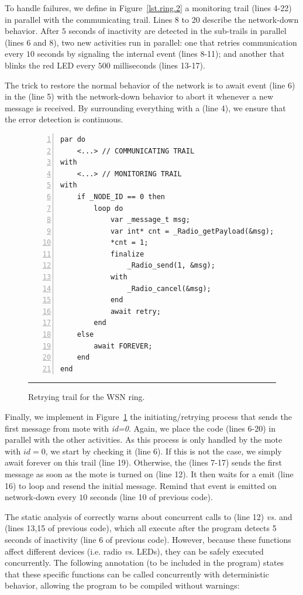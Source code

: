 To handle failures, we define in Figure~\ref{lst.ring.2} a monitoring trail 
(lines 4-22) in parallel with the communicating trail.
%
Lines 8 to 20 describe the network-down behavior.
After $5$ seconds of inactivity are detected in the sub-trails in parallel 
(lines 6 and 8), two new activities run in parallel: one that retries 
communication every $10$ seconds by signaling the internal event  
(lines 8-11); and another that blinks the red LED every $500$ milliseconds 
(lines 13-17).

The trick to restore the normal behavior of the network is to await event 
 (line 6) in the  (line 5) with the 
network-down behavior to abort it whenever a new message is received.
By surrounding everything with a  (line 4), we ensure that the error 
detection is continuous.

\begin{figure}[ht]
\begin{lstlisting}[numbers=left,xleftmargin=2em]
par do
    <...> // COMMUNICATING TRAIL
with
    <...> // MONITORING TRAIL
with
    if _NODE_ID == 0 then
        loop do
            var _message_t msg;
            var int* cnt = _Radio_getPayload(&msg);
            *cnt = 1;
            finalize
                _Radio_send(1, &msg);
            with
                _Radio_cancel(&msg);
            end
            await retry;
        end
    else
        await FOREVER;
    end
end
\end{lstlisting}
\rule{14cm}{0.37pt}
\caption{ Retrying trail for the WSN ring.%
{\small %
}%
\label{lst.ring.3}
}
\end{figure}

Finally, we implement in Figure~\ref{lst.ring.3} the initiating/retrying 
process that sends the first message from mote with \emph{id=0}.
Again, we place the code (lines 6-20) in parallel with the other activities.
%
As this process is only handled by the mote with $id=0$, we start by checking 
it (line 6).
If this is not the case, we simply await forever on this trail (line 19).
Otherwise, the  (lines 7-17) sends the first message as soon as the 
mote is turned on (line 12).
It then waits for a  emit (line 16) to loop and resend the initial 
message.
Remind that event  is emitted on network-down every $10$ seconds 
(line 10 of previous code).

The static analysis of \CEU correctly warns about concurrent calls to 
 (line 12) \emph{vs.}  and 
 (lines 13,15 of previous code), which all execute 
after the program detects 5 seconds of inactivity (line 6 of previous code).
However, because these functions affect different devices (i.e. radio 
\emph{vs.} LEDs), they can be safely executed concurrently.
The following annotation (to be included in the program) states that these 
specific functions can be called concurrently with deterministic behavior, 
allowing the program to be compiled without warnings:

